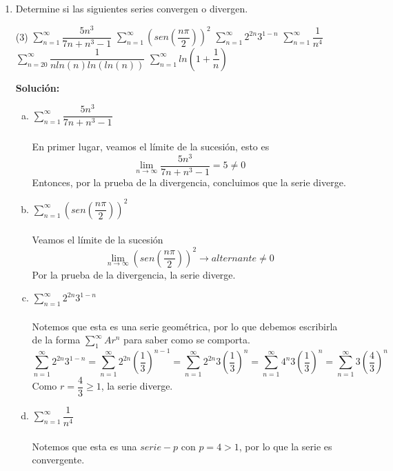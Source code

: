 \documentclass[12pt]{article}
\newenvironment{solucion}
{\begin{mdframed}[backgroundcolor=black!10]
		{\bf Solución:}\\
	}
	{
	\end{mdframed}
}
\newenvironment{preguntas}
{\begin{enumerate}\itemsep12pt
	}
	{
	\end{enumerate}
}
\newcommand{\ev}{\Big|}
\newcommand{\ra}{\rightarrow}
\begin{document}
\begin{preguntas}
\begin{solucion}
\begin{enumerate}[a)]
$$			= \pi \left(-\dfrac{1}{x}\ev_1^{\infty}\right)$$
			$$V = \pi$$
\end{enumerate}
\end{solucion}
\item Determine si las siguientes series convergen o divergen.
\begin{tasks}(3)
\task $\sum\limits_{n=1}^{\infty}\dfrac{5n^3}{7n+n^3-1}$
\task $\sum\limits_{n=1}^{\infty}\left(sen\left(\dfrac{n\pi}{2}\right)\right)^2$
\task $\sum\limits_{n=1}^{\infty}2^{2n}3^{1-n}$
\task $\sum\limits_{n=1}^{\infty}\dfrac{1}{n^4}$
\task $\sum\limits_{n=20}^{\infty}\dfrac{1}{nln(n)ln(ln(n))}$
\task $\sum\limits_{n=1}^{\infty}ln\left(1+\dfrac{1}{n}\right)$
\end{tasks}
\begin{solucion}

\begin{enumerate}[a)]
\item $\sum\limits_{n=1}^{\infty}\dfrac{5n^3}{7n+n^3-1}$\\
			\\
			En primer lugar, veamos el límite de la sucesión, esto es
			$$\lim\limits_{n\ra \infty} \dfrac{5n^3}{7n+n^3-1} = 5 \neq 0$$
			Entonces, por la prueba de la divergencia, concluimos que la serie diverge.
\item $\sum\limits_{n=1}^{\infty}\left(sen\left(\dfrac{n\pi}{2}\right)\right)^2$\\
			\\
			Veamos el límite de la sucesión
			$$\lim\limits_{n\ra \infty} \left(sen\left(\dfrac{n\pi}{2}\right)\right)^2 \ra alternante \neq 0$$
			Por la prueba de la divergencia, la serie diverge.
\item $\sum\limits_{n=1}^{\infty}2^{2n}3^{1-n}$\\
			\\
			Notemos que esta es una serie geométrica, por lo que debemos escribirla de la forma $\sum\limits_1^{\infty} Ar^n$ para saber como se comporta.
			$$\sum\limits_{n=1}^{\infty}2^{2n}3^{1-n}
			= \sum\limits_{n=1}^{\infty}2^{2n}\left(\dfrac{1}{3}\right)^{n-1}
			= \sum\limits_{n=1}^{\infty}2^{2n}3\left(\dfrac{1}{3}\right)^n
			= \sum\limits_{n=1}^{\infty}4^{n}3\left(\dfrac{1}{3}\right)^n
			= \sum\limits_{n=1}^{\infty}3\left(\dfrac{4}{3}\right)^n$$
			Como $r = \dfrac{4}{3} \geq 1$, la serie diverge.
\item $\sum\limits_{n=1}^{\infty}\dfrac{1}{n^4}$\\
			\\
			Notemos que esta es una $serie-p$ con $p=4>1$, por lo que la serie es convergente.

\end{enumerate}
\end{solucion}
\end{preguntas}
\end{document}
